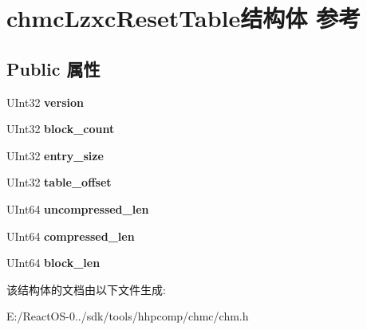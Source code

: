 \hypertarget{structchmc_lzxc_reset_table}{}\section{chmc\+Lzxc\+Reset\+Table结构体 参考}
\label{structchmc_lzxc_reset_table}
\subsection*{Public 属性}
\begin{DoxyCompactItemize}
\item 
\mbox{\label{structchmc_lzxc_reset_table_a23d770f571656753db1b218cb8c075e5}} 
U\+Int32 {\bfseries version}
\item 
\mbox{\label{structchmc_lzxc_reset_table_af44b562f09fddacc706bfae55ed40ce2}} 
U\+Int32 {\bfseries block\+\_\+count}
\item 
\mbox{\label{structchmc_lzxc_reset_table_a2eab91159084b011fafc4325dde90abd}} 
U\+Int32 {\bfseries entry\+\_\+size}
\item 
\mbox{\label{structchmc_lzxc_reset_table_a33fdce22b95e1c9e63f0ff9c9e75958b}} 
U\+Int32 {\bfseries table\+\_\+offset}
\item 
\mbox{\label{structchmc_lzxc_reset_table_a7a25c01643c219248397f01c09bc2ffc}} 
U\+Int64 {\bfseries uncompressed\+\_\+len}
\item 
\mbox{\label{structchmc_lzxc_reset_table_a32ef135344a5d9f09eaa2785547118b6}} 
U\+Int64 {\bfseries compressed\+\_\+len}
\item 
\mbox{\label{structchmc_lzxc_reset_table_afc3f4f8debea0ddaab5bbe3524a38189}} 
U\+Int64 {\bfseries block\+\_\+len}
\end{DoxyCompactItemize}


该结构体的文档由以下文件生成\+:\begin{DoxyCompactItemize}
\item 
E\+:/\+React\+O\+S-\/0../sdk/tools/hhpcomp/chmc/chm.\+h\end{DoxyCompactItemize}
